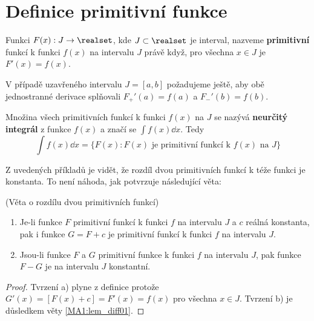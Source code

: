   \section{Definice primitivní funkce}  
    \begin{mdframed}[style=mdmathdef] 
      \begin{definition}\label{mai:def002}
        Funkci \(F(x): J\rightarrow \realset\), kde \(J\subset \realset\) je interval, nazveme
        \textbf{primitivní} funkcí k funkci \(f(x)\) na intervalu \(J\) právě když, pro všechna
        \(x\in J\) je \(F'(x) = f(x)\). 
        
        V případě uzavřeného intervalu \(J=[a,b]\) požadujeme ještě, aby obě jednostranné derivace
        splňovali \(F_+'(a)=f(a)\) a \(F_-'(b)=f(b)\). 
        
        Množina všech primitivních funkcí k funkci \(f(x)\) na \(J\) se nazývá \textbf{neurčitý
        integrál} z funkce \(f(x)\) a značí se \(\int f(x)\dd{x}\). Tedy
        \begin{equation}\label{mai:eq101}
          \int f(x)\dd{x} = \{F(x): \text{\(F(x)\) je primitivní funkcí k \(f(x)\) na \(J\)}\}
        \end{equation}
      \end{definition}
    \end{mdframed}
    
    
    Z uvedených příkladů je vidět, že rozdíl dvou primitivních funkcí k téže funkci je konstanta. To
    není náhoda, jak potvrzuje následující věta:

    \begin{mdframed}[style=mdmathlemma] 
      \begin{lemma}\label{mai:lemma008}(Věta o rozdílu dvou primitivních funkcí)
        \begin{enumerate}[noitemsep]
          \item Je-li funkce $F$ primitivní funkcí k funkci \(f\) na intervalu \(J\) a \(c\) reálná  
                konstanta, pak i funkce $G = F + c$ je primitivní funkcí k funkci \(f\) na intervalu 
                \(J\).
          \item Jsou-li funkce $F$ a $G$ primitivní funkce k funkci \(f\) na intervalu \(J\), pak 
          funkce
                $F-G$ je na intervalu \(J\) konstantní.
        \end{enumerate} 
        \begin{proof}
          Tvrzení a) plyne z definice protože $G'(x) = [F(x) + c] = F'(x) = f(x)$ pro všechna $x\in
          J$. Tvrzení b) je důsledkem věty \ref{MA1:lem_diff01}.
        \end{proof}
      \end{lemma}
    \end{mdframed}

